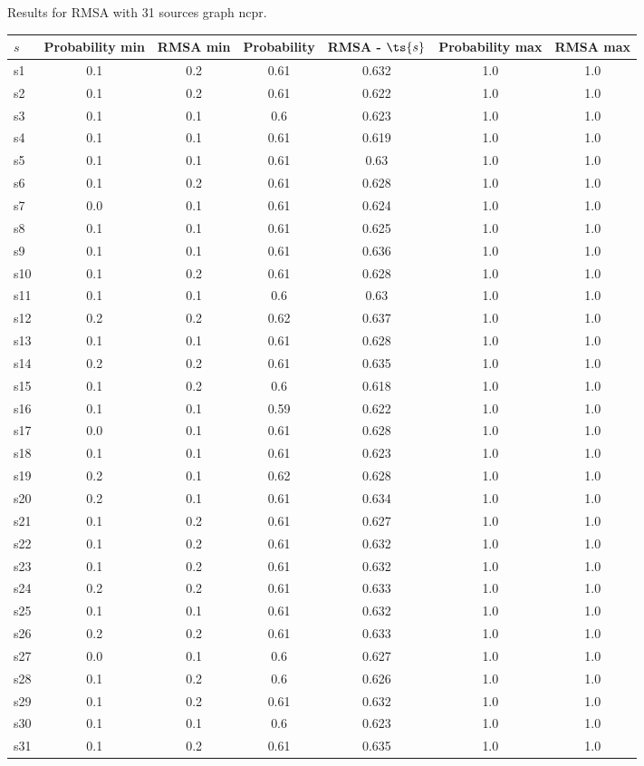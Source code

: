 \documentclass{article}
\begin{document}
\noindent Results for RMSA with 31 sources graph ncpr.

\noindent\begin{tabular}{|l|c|c|c|c|c|c|}
\hline
$s$& Probability min & RMSA min & Probability & RMSA - $\ts{s}$ & Probability max & RMSA max\\
\hline
s1 &0.1 & 0.2 & 0.61 & 0.632 & 1.0 & 1.0\\
\hline
s2 &0.1 & 0.2 & 0.61 & 0.622 & 1.0 & 1.0\\
\hline
s3 &0.1 & 0.1 & 0.6 & 0.623 & 1.0 & 1.0\\
\hline
s4 &0.1 & 0.1 & 0.61 & 0.619 & 1.0 & 1.0\\
\hline
s5 &0.1 & 0.1 & 0.61 & 0.63 & 1.0 & 1.0\\
\hline
s6 &0.1 & 0.2 & 0.61 & 0.628 & 1.0 & 1.0\\
\hline
s7 &0.0 & 0.1 & 0.61 & 0.624 & 1.0 & 1.0\\
\hline
s8 &0.1 & 0.1 & 0.61 & 0.625 & 1.0 & 1.0\\
\hline
s9 &0.1 & 0.1 & 0.61 & 0.636 & 1.0 & 1.0\\
\hline
s10 &0.1 & 0.2 & 0.61 & 0.628 & 1.0 & 1.0\\
\hline
s11 &0.1 & 0.1 & 0.6 & 0.63 & 1.0 & 1.0\\
\hline
s12 &0.2 & 0.2 & 0.62 & 0.637 & 1.0 & 1.0\\
\hline
s13 &0.1 & 0.1 & 0.61 & 0.628 & 1.0 & 1.0\\
\hline
s14 &0.2 & 0.2 & 0.61 & 0.635 & 1.0 & 1.0\\
\hline
s15 &0.1 & 0.2 & 0.6 & 0.618 & 1.0 & 1.0\\
\hline
s16 &0.1 & 0.1 & 0.59 & 0.622 & 1.0 & 1.0\\
\hline
s17 &0.0 & 0.1 & 0.61 & 0.628 & 1.0 & 1.0\\
\hline
s18 &0.1 & 0.1 & 0.61 & 0.623 & 1.0 & 1.0\\
\hline
s19 &0.2 & 0.1 & 0.62 & 0.628 & 1.0 & 1.0\\
\hline
s20 &0.2 & 0.1 & 0.61 & 0.634 & 1.0 & 1.0\\
\hline
s21 &0.1 & 0.2 & 0.61 & 0.627 & 1.0 & 1.0\\
\hline
s22 &0.1 & 0.2 & 0.61 & 0.632 & 1.0 & 1.0\\
\hline
s23 &0.1 & 0.2 & 0.61 & 0.632 & 1.0 & 1.0\\
\hline
s24 &0.2 & 0.2 & 0.61 & 0.633 & 1.0 & 1.0\\
\hline
s25 &0.1 & 0.1 & 0.61 & 0.632 & 1.0 & 1.0\\
\hline
s26 &0.2 & 0.2 & 0.61 & 0.633 & 1.0 & 1.0\\
\hline
s27 &0.0 & 0.1 & 0.6 & 0.627 & 1.0 & 1.0\\
\hline
s28 &0.1 & 0.2 & 0.6 & 0.626 & 1.0 & 1.0\\
\hline
s29 &0.1 & 0.2 & 0.61 & 0.632 & 1.0 & 1.0\\
\hline
s30 &0.1 & 0.1 & 0.6 & 0.623 & 1.0 & 1.0\\
\hline
s31 &0.1 & 0.2 & 0.61 & 0.635 & 1.0 & 1.0\\
\hline
\end{tabular}\\
\end{document}
